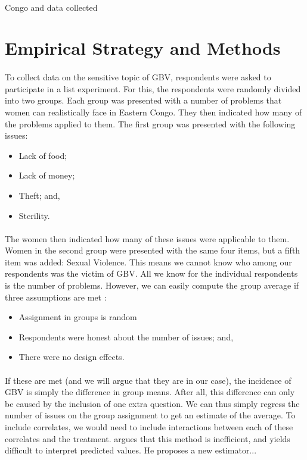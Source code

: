 \documentclass[11pt,a4paper]{scrartcl} %
\begin{document}
\paragraph{}
Congo and data collected

\section*{Empirical Strategy and Methods}
\paragraph{}
To collect data on the sensitive topic of GBV, respondents were asked to participate in a list experiment. For this, the respondents were randomly divided into two groups. Each group was presented with a number of problems that women can realistically face in Eastern Congo. They then indicated how many of the problems applied to them. The first group was presented with the following issues:
\begin{itemize}
	\item Lack of food;
	\item Lack of money;
	\item Theft; and,
	\item Sterility.
\end{itemize}

\paragraph{}
The women then indicated how many of these issues were applicable to them. Women in the second group were presented with the same four items, but a fifth item was added: Sexual Violence. This means we cannot know who among our respondents was the victim of GBV. All we know for the individual respondents is the number of problems. However, we can easily compute the group average if three assumptions are met \citep{Tsai2019}:
\begin{itemize}
	\item Assignment in groups is random
	\item Respondents were honest about the number of issues; and,
	\item There were no design effects.
\end{itemize}

\paragraph{}
If these are met (and we will argue that they are in our case), the incidence of GBV is simply the difference in group means. After all, this difference can only be caused by the inclusion of one extra question. We can thus simply regress the number of issues on the group assignment to get an estimate of the average. To include correlates, we would need to include interactions between each of these correlates and the treatment. \cite{Imai2011} argues that this method is inefficient, and yields difficult to interpret predicted values. He proposes a new estimator...
\end{document}
